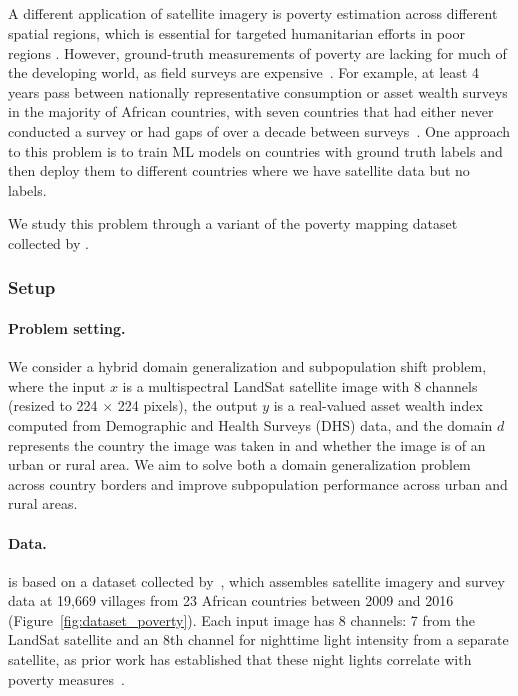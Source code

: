 \subsection{\PovertyMap}\label{sec:app_povertymap}

A different application of satellite imagery is poverty estimation across different spatial regions, which is essential for targeted humanitarian efforts in poor regions \citep{abelson2014poor,epsey2015development}.
However, ground-truth measurements of poverty are lacking for much of the developing world, as field surveys are expensive~\citep{blumenstock2015poverty,xie2016transfer,jean2016combining}.
For example, at least 4 years pass between nationally representative consumption or asset wealth surveys in the majority of African countries, with seven countries that had either never conducted a survey or had gaps of over a decade between surveys~\citep{yeh2020poverty}.
One approach to this problem is to train ML models on countries with ground truth labels and then deploy them to different countries where we have satellite data but no labels.

We study this problem through a variant of the poverty mapping dataset collected by \citet{yeh2020poverty}.

\subsubsection{Setup}

\paragraph{Problem setting.}
We consider a hybrid domain generalization and subpopulation shift problem,
where the input $x$ is a multispectral LandSat satellite image with 8 channels (resized to 224 $\times$ 224 pixels),
the output $y$ is a real-valued asset wealth index computed from Demographic and Health Surveys (DHS) data, and the domain $d$ represents the country the image was taken in and whether the image is of an urban or rural area.
We aim to solve both a domain generalization problem across country borders and improve subpopulation performance across urban and rural areas.

\paragraph{Data.}
\PovertyMap is based on a dataset collected by~\citet{yeh2020poverty}, which assembles satellite imagery and survey data at 19,669 villages from 23 African countries between 2009 and 2016 (Figure~\ref{fig:dataset_poverty}).
Each input image has 8 channels: 7 from the LandSat satellite and an 8th channel for nighttime light intensity from a separate satellite,
as prior work has established that these night lights correlate with poverty measures~\citep{noor2008nighttime,elvidge2009poverty}.


